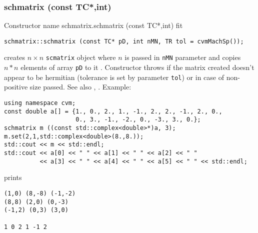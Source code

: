 \subsubsection{schmatrix (const TC*,int)}
Constructor%
\pdfdest name {schmatrix.schmatrix (const TC*,int)} fit
\begin{verbatim}
schmatrix::schmatrix (const TC* pD, int nMN, TR tol = cvmMachSp());
\end{verbatim}
creates  $n\times n$ \verb"scmatrix" object where $n$ is passed in
\verb"nMN" parameter
and copies $n*n$ elements of  array \verb"pD" to it .
Constructor throws  
if the matrix created doesn't appear to be hermitian (tolerance is set by
parameter \verb'tol') or in case of non-positive size passed. 
See also ,
.
Example:
\begin{Verbatim}
using namespace cvm;
const double a[] = {1., 0., 2., 1., -1., 2., 2., -1., 2., 0.,
                    0., 3., -1., -2., 0., -3., 3., 0.};
schmatrix m ((const std::complex<double>*)a, 3);
m.set(2,1,std::complex<double>(8.,8.));
std::cout << m << std::endl;
std::cout << a[0] << " " << a[1] << " " << a[2] << " "
          << a[3] << " " << a[4] << " " << a[5] << " " << std::endl;
\end{Verbatim}
prints
\begin{Verbatim}
(1,0) (8,-8) (-1,-2)
(8,8) (2,0) (0,-3)
(-1,2) (0,3) (3,0)

1 0 2 1 -1 2
\end{Verbatim}
\newpage



